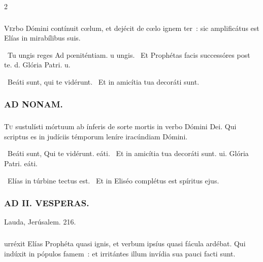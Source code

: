 \documentclass[9pt,twoside]{extarticle}
\begin{document}
\begin{multicols}{2}
{{\subsubsection*{}
\lettrine{V}erbo Dómini contínuit cœlum, et dejécit de cœlo ignem ter~: sic amplificátus est Elías in mirabílibus suis.

\begin{tightlist}
\item {}~Tu ungis reges \textred{*} Ad pœniténtiam. u ungis. ~Et Prophétas facis successóres post te. d. Glória Patri. u.
\item {}~Beáti sunt, qui te vidérunt. ~Et in amicítia tua decoráti sunt.
\end{tightlist}

\subsubsection*{\center \textsc{AD NONAM.}}
\subsubsection*{}
\lettrine{T}u sustulísti mórtuum ab ínferis de sorte mortis in verbo Dómini Dei. Qui scriptus es in judíciis témporum leníre iracúndiam Dómini.

\begin{tightlist}
\item {}~Beáti sunt, \textred{*} Qui te vidérunt. eáti. ~Et in amicítia tua decoráti sunt. ui. Glória Patri. eáti.
\item {}~Elías in túrbine tectus est. ~Et in Eliséo complétus est spíritus ejus.
\end{tightlist}

\subsubsection*{\center \textsc{AD II. VESPERAS.}}
\begin{tightlist}
\item {} Lauda, Jerúsalem. 216.
\end{tightlist}

\subsubsection*{}
urréxit Elías Prophéta quasi ignis, et verbum ipsíus quasi fácula ardébat. Qui indúxit in pópulos famem~: et irritántes illum invídia sua pauci facti sunt.

}}
\end{multicols}
\end{document}
